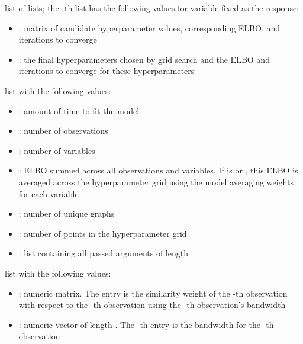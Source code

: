 \documentclass[a4paper]{book}
\begin{document}
\begin{Value}
\begin{ldescription}
\begin{itemize}
\end{itemize}



\item[\code{hyperparameters}] list of  lists; the -th list has the
following values for variable  fixed as the response:

\begin{itemize}

\item{} : matrix of candidate hyperparameter values, corresponding
ELBO, and iterations to converge
\item{} : the final hyperparameters chosen by grid search and the
ELBO and iterations to converge for these hyperparameters

\end{itemize}



\item[\code{model\_details}] list with the following values:

\begin{itemize}

\item{} : amount of time to fit the model
\item{} : number of observations
\item{} : number of variables
\item{} : ELBO summed across all observations and variables. If
 is  or , this ELBO is averaged
across the hyperparameter grid using the model averaging weights for
each variable
\item{} : number of unique graphs
\item{} : number of points in the hyperparameter grid
\item{} : list containing all passed arguments of length 

\end{itemize}



\item[\code{weights}] list with the following values:

\begin{itemize}

\item{} :  numeric matrix. The 
entry is the similarity weight of the -th observation with
respect to the -th observation using the -th observation's
bandwidth
\item{} : numeric vector of length . The -th
entry is the bandwidth for the -th observation

\end{itemize}


\end{ldescription}
\end{Value}
\end{document}
